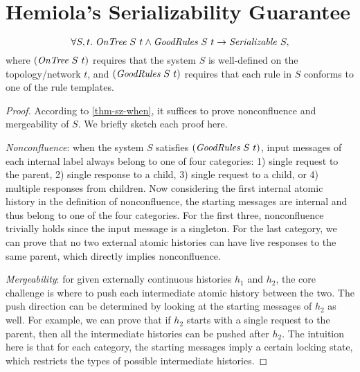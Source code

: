 \documentclass[sigplan,10pt,review,anonymous,screen]{acmart}\settopmatter{printfolios=true,printccs=false,printacmref=false}
\begin{document}
\section{Hemiola's Serializability Guarantee}
\label{sec-appx-sz-guarantee}

\renewcommand*{\proofname}{Proof Sketch}
\begin{theorem}
  \begin{displaymath}
    \forall S, t.\; \textit{OnTree}\ S\ t \land \textit{GoodRules}\ S\ t \to \mathit{Serializable}\ S,
  \end{displaymath}
  where $(\textit{OnTree}\ S\ t)$ requires that the system $S$ is well-defined on the
  topology/network $t$, and $(\textit{GoodRules}\ S\ t)$ requires that each rule in $S$
  conforms to one of the rule templates.
\end{theorem}
\begin{proof}
  According to \autoref{thm-sz-when}, it suffices to prove nonconfluence and mergeability of $S$. We briefly sketch each proof here.

  \emph{Nonconfluence}: when the system $S$ satisfies $(\textit{GoodRules}\ S\ t)$, input messages of each internal label always belong to one of four categories:
  1) single request to the parent, 2) single response to a child, 3) single request to a child, or 4) multiple responses from children.
  Now considering the first internal atomic history in the definition of nonconfluence, the starting messages are internal and thus belong to one of the four categories.
  For the first three, nonconfluence trivially holds since the input message is a singleton.
  For the last category, we can prove that no two external atomic histories can have live responses to the same parent, which directly implies nonconfluence.

  \emph{Mergeability}: for given externally continuous histories $h_1$ and $h_2$, the core challenge is where to push each intermediate atomic history between the two.
  The push direction can be determined by looking at the starting messages of $h_2$ as well.
  For example, we can prove that if $h_2$ starts with a single request to the parent, then all the intermediate histories can be pushed after $h_2$.
  The intuition here is that for each category, the starting messages imply a certain locking state, which restricts the types of possible intermediate histories.
\end{proof}
\renewcommand*{\proofname}{Proof}
\end{document}
